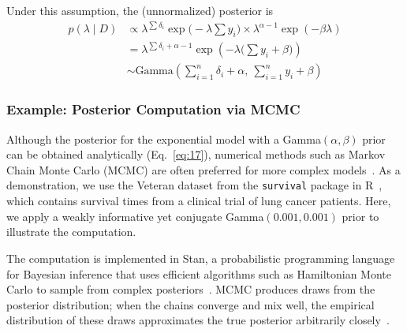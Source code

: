 Under this assumption, the (unnormalized) posterior is
\begin{align}
p(\lambda\mid D)
&\propto
\lambda^{\sum \delta_i}
\exp\Big(-\lambda \sum y_i\Big)
\times
\lambda^{\alpha - 1}
\exp(-\beta \lambda)\\
&=\lambda^{\sum \delta_i + \alpha - 1}
\exp \left( - \lambda \big(\sum y_i + \beta\big) \right) \\
&\sim
\text{Gamma}
\left(
\sum_{i=1}^{n} \delta_i + \alpha,\ \sum_{i=1}^{n} y_i + \beta
\right)
\label{eq:17}
\end{align}

\subsubsection{Example: Posterior Computation via MCMC}
Although the posterior for the exponential model with a Gamma$(\alpha,\beta)$ prior can be obtained analytically (Eq.~\ref{eq:17}), numerical methods such as Markov Chain Monte Carlo (MCMC) are often preferred for more complex models~\cite{robert2007bayesian,ibrahim2013bayesian}. As a demonstration, we use the Veteran dataset from the \texttt{survival} package in R~\cite{survival-package}, which contains survival times from a clinical trial of lung cancer patients. Here, we apply a weakly informative yet conjugate Gamma$(0.001,0.001)$ prior to illustrate the computation.

The computation is implemented in Stan, a probabilistic programming language for Bayesian inference that uses efficient algorithms such as Hamiltonian Monte Carlo to sample from complex posteriors~\cite{JSSv076i01}. MCMC produces draws from the posterior distribution; when the chains converge and mix well, the empirical distribution of these draws approximates the true posterior arbitrarily closely~\cite{https://doi.org/10.1111/2041-210X.12681}.

